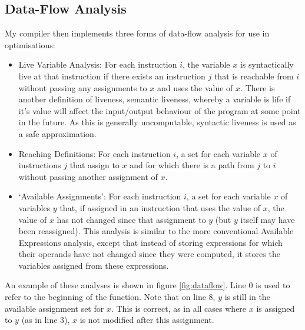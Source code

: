 \documentclass[12pt,twoside,notitlepage]{report}
\begin{document}
\subsection{Data-Flow Analysis}
My compiler then implements three forms of data-flow analysis for use in optimisations:
\begin{itemize}
	\item Live Variable Analysis: For each instruction $i$, the variable $x$ is syntactically live at that instruction if there exists an instruction $j$ that is reachable from $i$ without passing any assignments to $x$ and uses the value of $x$. There is another definition of liveness, semantic liveness, whereby a variable is life if it's value will affect the input/output behaviour of the program at some point in the future. As this is generally uncomputable, syntactic liveness is used as a safe approximation.
	\item Reaching Definitions: For each instruction $i$, a set for each variable $x$ of instructions $j$ that assign to $x$ and for which there is a path from $j$ to $i$ without passing another assignment of $x$.
	\item `Available Assignments': For each instruction $i$, a set for each variable $x$ of variables $y$ that, if assigned in an instruction that uses the value of $x$, the value of $x$ has not changed since that assignment to $y$ (but $y$ itself may have been reassigned). This analysis is similar to the more conventional Available Expressions analysis, except that instead of storing expressions for which their operands have not changed since they were computed, it stores the variables assigned from these expressions.
\end{itemize}
An example of these analyses is shown in figure \ref{fig:dataflow}. Line 0 is used to refer to the beginning of the function. Note that on line 8, $y$ is still in the available assignment set for $x$. This is correct, as in all cases where $x$ is assigned to $y$ (as in line 3), $x$ is not modified after this assignment.
\end{document}
